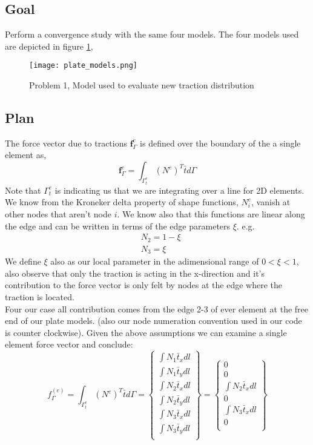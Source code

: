 \documentclass[a4paper]{memoir}
\begin{document}
\subsection{Goal}
Perform a convergence study with the same four models. The four models used are depicted in figure \ref{fig:models},

\begin{figure}
	\centering
		\texttt{[image: plate\_models.png]}
	\caption{Problem 1, Model used to evaluate new traction distribution}
	\label{fig:models}
\end{figure}

\subsection{Plan}
The force vector due to tractions $\textbf{f}^e_\Gamma$ is defined over the boundary of the a single element as,
\begin{equation}
	\textbf{f}^e_\Gamma = \int_{\Gamma^e_t} (N^{e})^{T} \bar{t} d\Gamma
\end{equation}
Note that $\Gamma^e_t$ is indicating us that we are integrating over a line for 2D elements.
We know from the Kroneker delta property of shape functions, $N^e_i$, vanish at other nodes that aren't node $i$. We know also that this functions are linear along the edge and can be written in terms of the edge parameters $\xi$. e.g.
\begin{align*}
	& N_2 = 1-\xi \\
	& N_3 = \xi
\end{align*}
We define $\xi$ also as our local parameter in the adimensional range of $0<\xi<1$, also observe that only the traction is acting in the x-direction and it's contribution to the force vector is only felt by nodes at the edge where the traction is located. \\
Four our case all contribution comes from the edge 2-3 of ever element at the free end of our plate models. (also our node numeration convention used in our code is counter clockwise). Given the above assumptions we can examine a single element force vector and conclude:
\begin{equation}
f_{\Gamma}^{(e)} = \int_{\Gamma^e_t} (N^{e})^{T} \bar{t} d\Gamma = 
	\begin{Bmatrix}
		\int N_1\bar{t}_x dl \\
		\int N_1\bar{t}_y dl \\
		\int N_2\bar{t}_x dl \\
		\int N_2\bar{t}_y dl \\
		\int N_3\bar{t}_x dl \\
		\int N_3\bar{t}_y dl \\
	\end{Bmatrix}
	=
	\begin{Bmatrix}
		0 \\
		0 \\
		\int N_2\bar{t}_x dl \\
		0 \\
		\int N_3\bar{t}_x dl \\
		0 \\
	\end{Bmatrix}
\end{equation}
\end{document}
